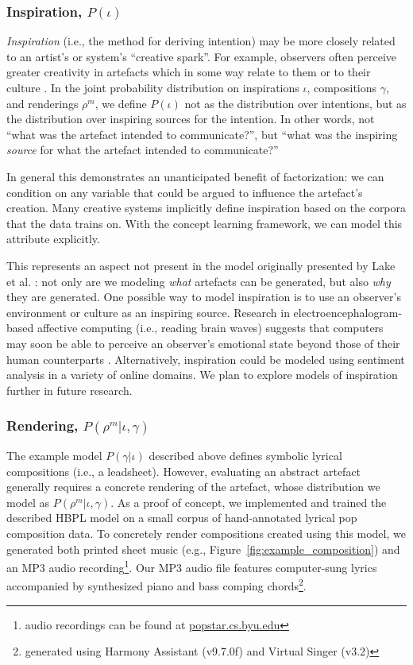 \documentclass[letterpaper]{article}
\begin{document}
\subsubsection{Inspiration, $P(\iota)$}

\emph{Inspiration} (i.e., the method for deriving intention) may be more closely related to an artist's or system's ``creative spark''. For example, observers often perceive greater creativity in artefacts which in some way relate to them or to their culture \cite{colton2008creativity}. In the joint probability distribution on inspirations $\iota$, compositions $\gamma$, and renderings $\rho^{m}$, we define $P(\iota)$ not as the distribution over intentions, but as the distribution over inspiring sources for the intention. In other words, not ``what was the artefact intended to communicate?'', but ``what was the inspiring \emph{source} for what the artefact intended to communicate?''

In general this demonstrates an unanticipated benefit of factorization: we can condition on any variable that could be argued to influence the artefact's creation. Many creative systems implicitly define inspiration based on the corpora that the data trains on. With the concept learning framework, we can model this attribute explicitly.

This represents an aspect not present in the model originally presented by Lake et al. : not only are we modeling \textit{what} artefacts can be generated, but also \textit{why} they are generated. One possible way to model inspiration is to use an observer's environment or culture as an inspiring source. Research in electroencephalogram-based affective computing (i.e., reading brain waves) suggests that computers may soon be able to perceive an observer's emotional state beyond those of their human counterparts \cite{volioti2016mapping}. Alternatively, inspiration could be modeled using sentiment analysis in a variety of online domains. We plan to explore models of inspiration further in future research.

\subsubsection{Rendering, $P(\rho^{m}|\iota,\gamma)$}

The example model $P(\gamma|\iota)$ described above defines symbolic lyrical compositions (i.e., a leadsheet). However, evaluating an abstract artefact generally requires a concrete rendering of the artefact, whose distribution we model as $P(\rho^{m}|\iota,\gamma)$. As a proof of concept, we implemented and trained the described HBPL model on a small corpus of hand-annotated lyrical pop composition data. To concretely render compositions created using this model, we generated both printed sheet music (e.g., Figure~\ref{fig:example_composition}) and an MP3 audio recording\footnote{audio recordings can be found at \url{popstar.cs.byu.edu}}. Our MP3 audio file features computer-sung lyrics accompanied by synthesized piano and bass comping chords\footnote{generated using Harmony Assistant (v9.7.0f) and Virtual Singer (v3.2)}.
\end{document}
